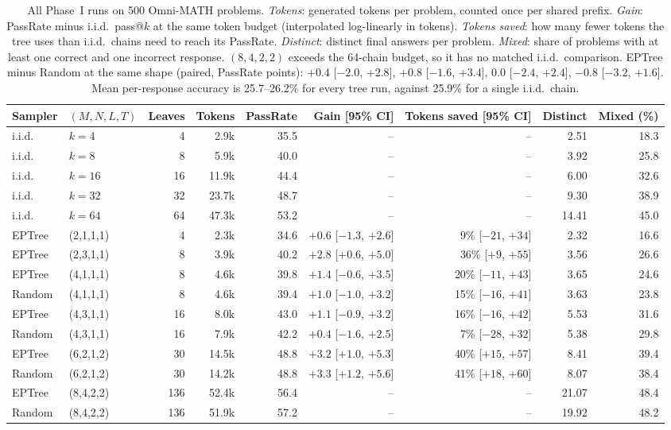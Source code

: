 \begin{table}[t]
\centering\footnotesize
\setlength{\tabcolsep}{3.6pt}
\begin{tabular}{@{}llrrrrrrr@{}}
\toprule
Sampler & $(M,N,L,T)$ & Leaves & Tokens & PassRate & Gain [95\% CI] & Tokens saved [95\% CI] & Distinct & Mixed (\%) \\
\midrule
i.i.d. & $k=4$ & 4 & 2.9k & 35.5 & -- & -- & 2.51 & 18.3 \\
i.i.d. & $k=8$ & 8 & 5.9k & 40.0 & -- & -- & 3.92 & 25.8 \\
i.i.d. & $k=16$ & 16 & 11.9k & 44.4 & -- & -- & 6.00 & 32.6 \\
i.i.d. & $k=32$ & 32 & 23.7k & 48.7 & -- & -- & 9.30 & 38.9 \\
i.i.d. & $k=64$ & 64 & 47.3k & 53.2 & -- & -- & 14.41 & 45.0 \\
\midrule
EPTree & (2,1,1,1) & 4 & 2.3k & 34.6 & $+0.6$ [$-1.3$, $+2.6$] & 9\% [$-21$, $+34$] & 2.32 & 16.6 \\
EPTree & (2,3,1,1) & 8 & 3.9k & 40.2 & $+2.8$ [$+0.6$, $+5.0$] & 36\% [$+9$, $+55$] & 3.56 & 26.6 \\
EPTree & (4,1,1,1) & 8 & 4.6k & 39.8 & $+1.4$ [$-0.6$, $+3.5$] & 20\% [$-11$, $+43$] & 3.65 & 24.6 \\
Random & (4,1,1,1) & 8 & 4.6k & 39.4 & $+1.0$ [$-1.0$, $+3.2$] & 15\% [$-16$, $+41$] & 3.63 & 23.8 \\
EPTree & (4,3,1,1) & 16 & 8.0k & 43.0 & $+1.1$ [$-0.9$, $+3.2$] & 16\% [$-16$, $+42$] & 5.53 & 31.6 \\
Random & (4,3,1,1) & 16 & 7.9k & 42.2 & $+0.4$ [$-1.6$, $+2.5$] & 7\% [$-28$, $+32$] & 5.38 & 29.8 \\
EPTree & (6,2,1,2) & 30 & 14.5k & 48.8 & $+3.2$ [$+1.0$, $+5.3$] & 40\% [$+15$, $+57$] & 8.41 & 39.4 \\
Random & (6,2,1,2) & 30 & 14.2k & 48.8 & $+3.3$ [$+1.2$, $+5.6$] & 41\% [$+18$, $+60$] & 8.07 & 38.4 \\
EPTree & (8,4,2,2) & 136 & 52.4k & 56.4 & -- & -- & 21.07 & 48.4 \\
Random & (8,4,2,2) & 136 & 51.9k & 57.2 & -- & -- & 19.92 & 48.2 \\
\bottomrule
\end{tabular}
\caption{All Phase~I runs on 500 Omni-MATH problems.
\emph{Tokens}: generated tokens per problem, counted once per shared prefix.
\emph{Gain}: PassRate minus i.i.d.\ pass@$k$ at the same token budget (interpolated log-linearly in tokens).
\emph{Tokens saved}: how many fewer tokens the tree uses than i.i.d.\ chains need to reach its PassRate.
\emph{Distinct}: distinct final answers per problem. \emph{Mixed}: share of problems with at least one correct and one incorrect response.
$(8,4,2,2)$ exceeds the 64-chain budget, so it has no matched i.i.d.\ comparison.
EPTree minus Random at the same shape (paired, PassRate points): $+0.4$ [$-2.0$, $+2.8$], $+0.8$ [$-1.6$, $+3.4$], $0.0$ [$-2.4$, $+2.4$], $-0.8$ [$-3.2$, $+1.6$].
Mean per-response accuracy is 25.7--26.2\% for every tree run, against 25.9\% for a single i.i.d.\ chain.}
\label{tab:task2}
\end{table}

